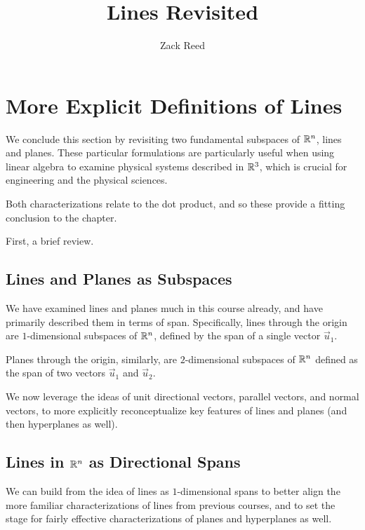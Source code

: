 \documentclass{ximera}
\author{Zack Reed}
\title{Lines Revisited}
\begin{document}
\begin{abstract}

\end{abstract}
\maketitle

\section*{More Explicit Definitions of Lines}

We conclude this section by revisiting two fundamental subspaces of $\mathbb{R}^n$, lines and planes. These particular formulations are particularly useful when using linear algebra to examine physical systems described in $\mathbb{R}^3$, which is crucial for engineering and the physical sciences. 

Both characterizations relate to the dot product, and so these provide a fitting conclusion to the chapter. 

First, a brief review. 

\subsection*{Lines and Planes as Subspaces}
  
We have examined lines and planes much in this course already, and have primarily described them in terms of span. Specifically, lines through the origin are $1$-dimensional subspaces of $\mathbb{R}^n$, defined by the span of a single vector $\vec{u}_1$. 

Planes through the origin, similarly, are $2$-dimensional subspaces of $\mathbb{R}^n$ defined as the span of two vectors $\vec{u}_1$ and $\vec{u}_2$.

We now leverage the ideas of unit directional vectors, parallel vectors, and normal vectors, to more explicitly reconceptualize key features of lines and planes (and then hyperplanes as well).

\subsection*{Lines in $\mathbb{R}^n$ as Directional Spans}

We can build from the idea of lines as $1$-dimensional spans to better align the more familiar characterizations of lines from previous courses, and to set the stage for fairly effective characterizations of planes and hyperplanes as well.
\end{document}
